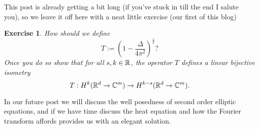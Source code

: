 \documentclass[12pt]{article}
\newtheorem{exercise}{Exercise}
\begin{document}
This post is already getting a bit long (if you've stuck in till the end I salute you), so we leave it off here with a neat little exercise (our first of this blog)
\begin{exercise}
	How should we define $$T:=\left(1-\frac{\Delta}{4\pi ^2}  \right)^\frac{s}{2}\text{?} $$ Once you do so show that for all $s,k \in {\mathbb R}$, the operator $T$ defines a linear bijective isometry
	\begin{equation*}
		T: H^k({\mathbb R}^d\to\mathbb{C}^m)\to H^{k-s}({\mathbb R}^d\to\mathbb{C}^m).
	\end{equation*}
\end{exercise}
In our future post we will discuss the well posedness of second order elliptic equations, and if we have time discuss the heat equation and how the Fourier transform affords provides us with an elegant solution.




\end{document}
